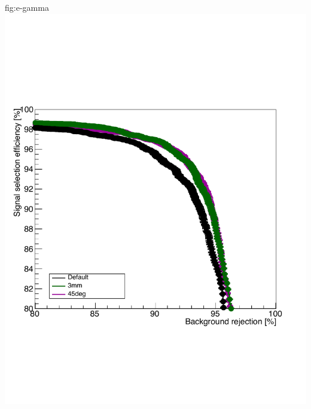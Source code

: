 \begin{itemize}
\begin{dunefigure}{fig:e-gamma}
\includegraphics[height=0.24\textheight]{graphics/sp-apa-eff-bkgd-wires.pdf} 
\end{dunefigure}


\end{itemize}
